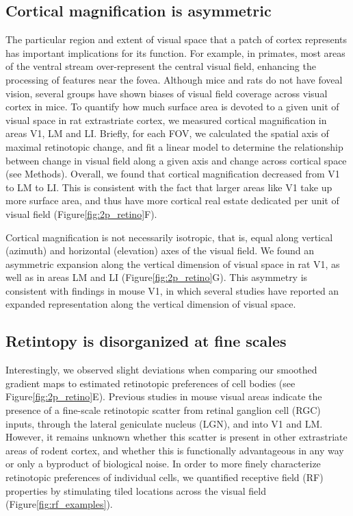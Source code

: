 \subsection{Cortical magnification is asymmetric}
The particular region and extent of visual space that a patch of cortex represents has important implications for its function. For example, in primates, most areas of the ventral stream over-represent the central visual field, enhancing the processing of features near the fovea\cite{Gattass2005CorticalDynamics}. Although mice and rats do not have foveal vision, several groups have shown biases of visual field coverage across visual cortex in mice\cite{Garrett2014, Marshel2011}. To quantify how much surface area is devoted to a given unit of visual space in rat extrastriate cortex, we measured cortical magnification in areas V1, LM and LI. Briefly, for each FOV, we calculated the spatial axis of maximal retinotopic change, and fit a linear model to determine the relationship between change in visual field along a given axis and change across cortical space (see Methods). Overall, we found that cortical magnification decreased from V1 to LM to LI. This is consistent with the fact that larger areas like V1 take up more surface area, and thus have more cortical real estate dedicated per unit of visual field (Figure\ref{fig:2p_retino}F). 

Cortical magnification is not necessarily isotropic, that is, equal along vertical (azimuth) and horizontal (elevation) axes of the visual field. We found an asymmetric expansion along the vertical dimension of visual space in rat V1, as well as in areas LM and LI (Figure\ref{fig:2p_retino}G). This asymmetry is consistent with findings in mouse V1, in which several studies have reported an expanded representation along the vertical dimension of visual space\cite{Garrett2014, Liang2018a, Bonin2011}.  

\subsection{Retintopy is disorganized at fine scales}
Interestingly, we observed slight deviations when comparing our smoothed gradient maps to estimated retinotopic preferences of cell bodies (see Figure\ref{fig:2p_retino}E). Previous studies in mouse visual areas indicate the presence of a fine-scale retinotopic scatter from retinal ganglion cell (RGC) inputs, through the lateral geniculate nucleus (LGN), and into V1 and LM\cite{Liang2018a, Andermann2011, Marques2018}. However, it remains unknown whether this scatter is present in other extrastriate areas of rodent cortex, and whether this is functionally advantageous in any way or only a byproduct of biological noise. In order to more finely characterize retinotopic preferences of individual cells, we quantified receptive field (RF) properties by stimulating tiled locations across the visual field (Figure\ref{fig:rf_examples}). 


